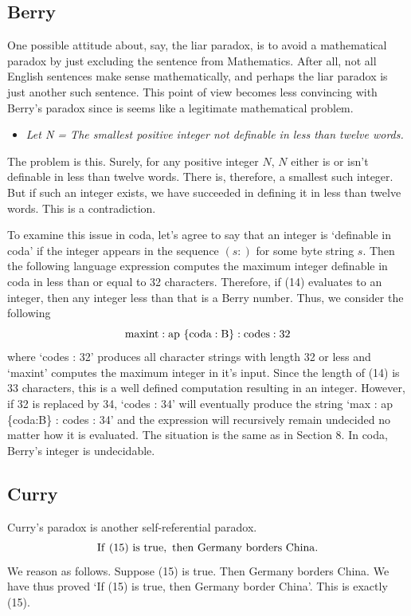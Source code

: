 \documentclass[11pt]{article}
\begin{document}
\subsection{Berry}

     One possible attitude about, say, the liar paradox, is to avoid a mathematical paradox by just excluding
the sentence  from Mathematics.  After all, not all English sentences make sense mathematically, and perhaps the liar paradox is just another such sentence.  This point of view becomes less convincing with Berry's paradox\cite{berry} since
 is seems like a legitimate mathematical problem.
 \begin{itemize}
 \item {\it Let N = The smallest positive integer not definable in less than twelve words.}
 \end{itemize}
The problem is this.  Surely, for any positive integer $N$, $N$ either is or isn't definable in less than twelve words.
There is, therefore, a smallest such integer.  But if such an integer exists, we have succeeded in defining it in
less than twelve words.  This is a contradiction.

    To examine this issue in coda, let's agree to say that an integer is `definable in coda' if the 
integer appears in the sequence $(s:)$ for some byte string $s$.  Then the following language expression 
computes the maximum integer definable in coda in less than or equal to 32 characters.  Therefore, 
if (14) evaluates to an integer, then any integer less than that is a Berry number.  
Thus, we consider the following 
\begin{equation}
{\rm maxint : ap\ \{coda:B\} : codes : 32}
\end{equation}
where `codes : 32' produces all character strings with length 32 or less and `maxint' computes the maximum integer in it's input.  
Since the length of (14) is 33 characters, this is a well defined computation resulting in an integer\cite{unrealistic}.  However, if 32 is replaced by 34,
`codes : 34' will eventually produce the string `max : ap \{coda:B\} : codes : 34' and the expression will
recursively remain undecided no matter how it is evaluated.  The situation is the same as in Section 8.  In coda, Berry's integer is undecidable.  

\subsection{Curry}

Curry's paradox\cite{Curry} is another self-referential paradox.  
\begin{equation}
{\rm If\ (15)\ is\ true,\ then\ Germany\ borders\ China.}
\end{equation}
We reason as follows.  Suppose (15) is true.  Then Germany borders China.  We have thus
proved `If (15) is true, then Germany border China'.  This is exactly (15).
\end{document}
